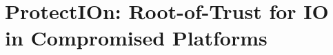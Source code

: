 \chapter{ProtectIOn: Root-of-Trust for IO in Compromised Platforms}
\label{ch:protectIOn}













